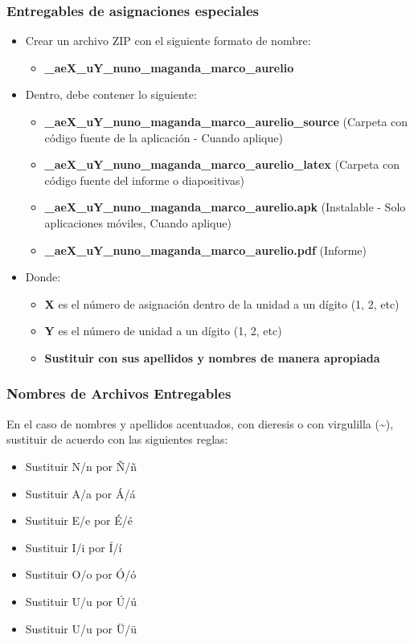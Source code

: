 \begin{frame}
\frametitle{Entregables de asignaciones especiales}
    \begin{itemize}
    \item Crear un archivo ZIP con el siguiente formato de nombre:
    \begin{itemize}
        \item \textbf{\clavegrupo\_aeX\_uY\_nuno\_maganda\_marco\_aurelio}
    \end{itemize}
    \item Dentro, debe contener lo siguiente:
        \begin{itemize}
        \item \textbf{\clavegrupo\_aeX\_uY\_nuno\_maganda\_marco\_aurelio\_source} (Carpeta con c\'odigo fuente de la aplicaci\'on - Cuando aplique)
        \item \textbf{\clavegrupo\_aeX\_uY\_nuno\_maganda\_marco\_aurelio\_latex} (Carpeta con c\'odigo fuente del informe o diapositivas)
        \item \textbf{\clavegrupo\_aeX\_uY\_nuno\_maganda\_marco\_aurelio.apk} (Instalable - Solo aplicaciones móviles, Cuando aplique)
        \item \textbf{\clavegrupo\_aeX\_uY\_nuno\_maganda\_marco\_aurelio.pdf} (Informe)
        \end{itemize}
    \item Donde:
        \begin{itemize}
        \item \textbf{X} es el n\'umero de asignación dentro de la unidad a un d\'igito (1, 2, etc)
        \item \textbf{Y} es el n\'umero de unidad a un d\'igito (1, 2, etc)
        \item \textbf{Sustituir con sus apellidos y nombres de manera apropiada} 
        \end{itemize}
    \end{itemize}
\end{frame}





\begin{frame}
\frametitle{Nombres de Archivos Entregables}
En el caso de nombres y apellidos acentuados, con dieresis o con virgulilla (\textasciitilde{}), sustituir de acuerdo con las siguientes reglas:
\begin{itemize}
\item Sustituir N/n por \~N/\~n
\item Sustituir A/a por \'A/\'a
\item Sustituir E/e por \'E/\'e
\item Sustituir I/i por \'I/\'i
\item Sustituir O/o por \'O/\'o
\item Sustituir U/u por \'U/\'u
\item Sustituir U/u por \"U/\"u
\end{itemize}
\end{frame}



